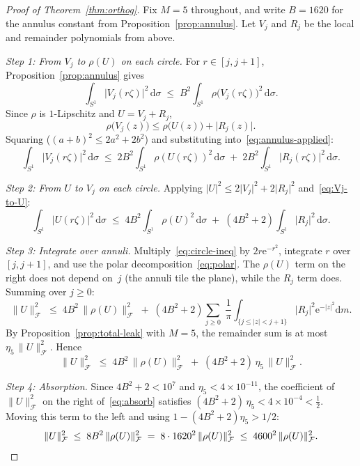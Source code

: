 \documentclass[11pt]{amsart}
\theoremstyle{remark}
\begin{document}
\begin{proof}[Proof of Theorem~\ref{thm:orthog}]
Fix $M = 5$ throughout, and write $B = 1620$ for the annulus constant from
Proposition~\ref{prop:annulus}.  Let $V_j$ and $R_j$ be the local and
remainder polynomials from above.

\medskip
\noindent
\emph{Step 1: From $V_j$ to $\rho(U)$ on each circle.}\;
For $r \in [j, j{+}1]$, Proposition~\ref{prop:annulus} gives
\begin{equation}\label{eq:annulus-applied}
\int_{S^1}\lvert V_j(r\zeta) \rvert^2\,\mathrm{d}\sigma
\;\le\;
B^2\int_{S^1}\rho\bigl(V_j(r\zeta)\bigr)^2\,\mathrm{d}\sigma.
\end{equation}
Since $\rho$ is $1$-Lipschitz and $U = V_j + R_j$,
\[
\rho\bigl(V_j(z)\bigr)
\le \rho\bigl(U(z)\bigr) + \lvert R_j(z) \rvert.
\]
Squaring ($(a+b)^2 \le 2a^2 + 2b^2$) and substituting
into~\eqref{eq:annulus-applied}:
\begin{equation}\label{eq:Vj-to-U}
\int_{S^1}\lvert V_j(r\zeta) \rvert^2\,\mathrm{d}\sigma
\;\le\;
2B^2\!\int_{S^1}\rho(U(r\zeta))^2\,\mathrm{d}\sigma
\;+\; 2B^2\!\int_{S^1}\lvert R_j(r\zeta) \rvert^2\,\mathrm{d}\sigma.
\end{equation}

\medskip
\noindent
\emph{Step 2: From $U$ to $V_j$ on each circle.}\;
Applying $\lvert U \rvert^2 \le 2\lvert V_j \rvert^2 + 2\lvert R_j \rvert^2$
and~\eqref{eq:Vj-to-U}:
\begin{equation}\label{eq:circle-ineq}
\int_{S^1}\lvert U(r\zeta) \rvert^2\,\mathrm{d}\sigma
\;\le\;
4B^2\!\int_{S^1}\rho(U)^2\,\mathrm{d}\sigma
\;+\; (4B^2 + 2)\!\int_{S^1}\lvert R_j \rvert^2\,\mathrm{d}\sigma.
\end{equation}

\medskip
\noindent
\emph{Step 3: Integrate over annuli.}\;
Multiply~\eqref{eq:circle-ineq} by $2r\mathrm{e}^{-r^2}$, integrate $r$ over
$[j, j{+}1]$, and use the polar decomposition~\eqref{eq:polar}.  The
$\rho(U)$ term on the right does not depend on~$j$ (the annuli tile the
plane), while the $R_j$ term does.  Summing over $j \ge 0$:
\[
\lVert U \rVert_\mathcal{F}^2
\;\le\;
4B^2\,\lVert \rho(U) \rVert_\mathcal{F}^2
\;+\;
(4B^2 + 2)\sum_{j \ge 0}\;
\frac{1}{\pi}\int_{\{j \le \lvert z \rvert < j+1\}}\!\!
\lvert R_j \rvert^2\mathrm{e}^{-\lvert z \rvert^2}\mathrm{d} m.
\]
By Proposition~\ref{prop:total-leak} with $M = 5$, the remainder sum is at
most $\eta_5\,\lVert U \rVert_\mathcal{F}^2$.  Hence
\begin{equation}\label{eq:absorb}
\lVert U \rVert_\mathcal{F}^2
\;\le\;
4B^2\,\lVert \rho(U) \rVert_\mathcal{F}^2
\;+\;
(4B^2 + 2)\,\eta_5\,\lVert U \rVert_\mathcal{F}^2.
\end{equation}

\medskip
\noindent
\emph{Step 4: Absorption.}\;
Since $4B^2 + 2 < 10^7$ and $\eta_5 < 4 \times 10^{-11}$, the coefficient
of $\lVert U \rVert_\mathcal{F}^2$ on the right of~\eqref{eq:absorb} satisfies
$(4B^2 + 2)\,\eta_5 < 4 \times 10^{-4} < \tfrac{1}{2}$.
Moving this term to the left and using $1 - (4B^2+2)\eta_5 > 1/2$:
\[
\lVert U \rVert_\mathcal{F}^2
\;\le\; 8B^2\,\lVert \rho(U) \rVert_\mathcal{F}^2
\;=\; 8 \cdot 1620^2\,\lVert \rho(U) \rVert_\mathcal{F}^2
\;\le\; 4600^2\,\lVert \rho(U) \rVert_\mathcal{F}^2.\qedhere
\]
\end{proof}
\end{document}
